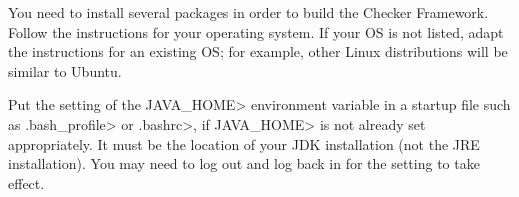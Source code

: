 
You need to install several packages in order to build the Checker
Framework.
Follow the instructions for your operating system.
If your OS is not listed, adapt the instructions for an existing OS;
for example, other Linux distributions will be similar to Ubuntu.

Put the setting of the \<JAVA\_HOME> environment variable in a startup file
such as \<.bash\_profile> or \<.bashrc>, if \<JAVA\_HOME> is not already
set appropriately.  It must be the location of your JDK
installation (not the JRE installation).
You may need to log out and log back in for the setting to take effect.

